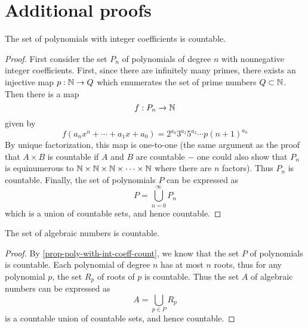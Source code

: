 \section{Additional proofs}

\begin{prop}\label{prop-poly-with-int-coeff-count}
	The set of polynomials with integer coefficients is countable.
\end{prop}

\begin{proof}
	First consider the set $P_n$ of polynomials of degree $n$ with nonnegative integer coefficients. First, since there are infinitely many primes, there exists an injective map $p: \mathbb N \rightarrow Q$ which enumerates the set of prime numbers $Q \subset \mathbb N$. Then there is a map
	$$
	f: P_n \rightarrow \mathbb N
	$$
	given by
	$$
	f\left(a_n x^n+\cdots+a_1 x+a_0\right)=2^{a_0} 3^{a_1} 5^{a_2} \cdots p(n+1)^{a_n}
	$$
	By unique factorization, this map is one-to-one (the same argument as the proof that $A \times B$ is countable if $A$ and $B$ are countable $-$ one could also show that $P_n$ is equinumerous to $\mathbb N \times \mathbb N \times \mathbb N \times \cdots \times \mathbb N$ where there are $n$ factors). Thus $P_n$ is countable. Finally, the set of polynomials $P$ can be expressed as
	$$
	P=\bigcup_{n=0}^{\infty} P_n
	$$
	which is a union of countable sets, and hence countable.
\end{proof}

\begin{prop}\label{prop-algebraic-numbers-countable}
	The set of algebraic numbers is countable.
\end{prop}

\begin{proof}
	By \vref{prop-poly-with-int-coeff-count}, we know that the set $P$ of polynomials is countable. Each polynomial of degree $n$ has at most $n$ roots, thus for any polynomial $p$, the set $R_p$ of roots of $p$ is countable. Thus the set $A$ of algebraic numbers can be expressed as
	$$
	A=\bigcup_{p \in P} R_p
	$$
	is a countable union of countable sets, and hence countable.
\end{proof}